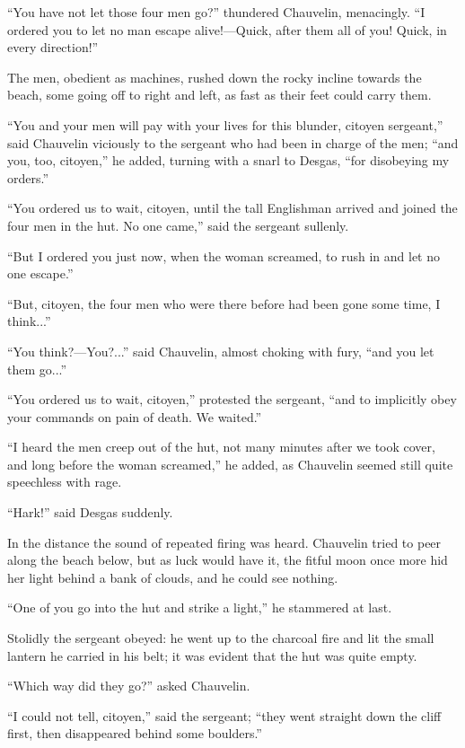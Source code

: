 \documentclass[paper=5.5in:8.5in,BCOR=7mm,twoside,DIV=calc,12pt,usegeometry,chapterprefix,endperiod,headings=big]{scrbook}
\begin{document}
\enquote{You have not let those four men go?} thundered Chauvelin, menacingly. \enquote{I ordered you to let no man escape alive!---Quick, after them all of you! Quick, in every direction!}

The men, obedient as machines, rushed down the rocky incline towards the beach, some going off to right and left, as fast as their feet could carry them.

\enquote{You and your men will pay with your lives for this blunder, citoyen sergeant,} said Chauvelin viciously to the sergeant who had been in charge of the men; \enquote{and you, too, citoyen,} he added, turning with a snarl to Desgas, \enquote{for disobeying my orders.}

\enquote{You ordered us to wait, citoyen, until the tall Englishman arrived and joined the four men in the hut. No one came,} said the sergeant sullenly.

\enquote{But I ordered you just now, when the woman screamed, to rush in and let no one escape.}

\enquote{But, citoyen, the four men who were there before had been gone some time, I think...}

\enquote{You think?---You?...} said Chauvelin, almost choking with fury, \enquote{and you let them go...}

\enquote{You ordered us to wait, citoyen,} protested the sergeant, \enquote{and to implicitly obey your commands on pain of death. We waited.}

\enquote{I heard the men creep out of the hut, not many minutes after we took cover, and long before the woman screamed,} he added, as Chauvelin seemed still quite speechless with rage.

\enquote{Hark!} said Desgas suddenly.

In the distance the sound of repeated firing was heard. Chauvelin tried to peer along the beach below, but as luck would have it, the fitful moon once more hid her light behind a bank of clouds, and he could see nothing.

\enquote{One of you go into the hut and strike a light,} he stammered at last.

Stolidly the sergeant obeyed: he went up to the charcoal fire and lit the small lantern he carried in his belt; it was evident that the hut was quite empty.

\enquote{Which way did they go?} asked Chauvelin.

\enquote{I could not tell, citoyen,} said the sergeant; \enquote{they went straight down the cliff first, then disappeared behind some boulders.}
\end{document}
